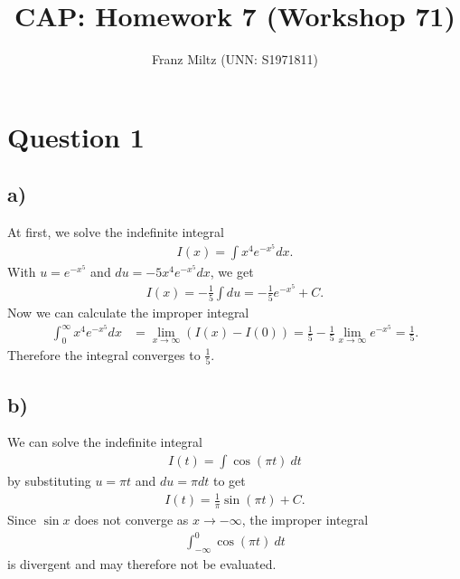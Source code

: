 \documentclass{article}
\title{CAP: Homework 7 (Workshop 71)}
\author{Franz Miltz (UNN: S1971811)}
\begin{document}
\maketitle
\section*{Question 1}
\subsection*{a)}
At first, we solve the indefinite integral
\begin{align*}
  I(x) = \int x^4e^{-x^5}dx.
\end{align*}
With $u=e^{-x^5}$ and $du=-5x^4e^{-x^5}dx$, we get
\begin{align*}
  I(x) = -\frac{1}{5}\int du = -\frac{1}{5}e^{-x^5} + C.
\end{align*}
Now we can calculate the improper integral
\begin{align*}
  \int_0^\infty x^4e^{-x^5}dx & = \lim_{x\to\infty}\left(I(x)-I(0)\right)
  = \frac{1}{5}-\frac{1}{5}\lim_{x\to\infty}e^{-x^5}=\frac{1}{5}.
\end{align*}
Therefore the integral converges to $\frac{1}{5}$.
\subsection*{b)}
We can solve the indefinite integral
\begin{align*}
  I(t) = \int \cos(\pi t)\:dt
\end{align*}
by substituting $u=\pi t$ and $du=\pi dt$ to get
\begin{align*}
  I(t) = \frac{1}{\pi} \sin(\pi t) + C.
\end{align*}
Since $\sin x$ does not converge as $x\to-\infty$, the improper integral
\begin{align*}
  \int_{-\infty}^0\cos(\pi t)\:dt
\end{align*}
is divergent and may therefore not be evaluated.
\end{document}
